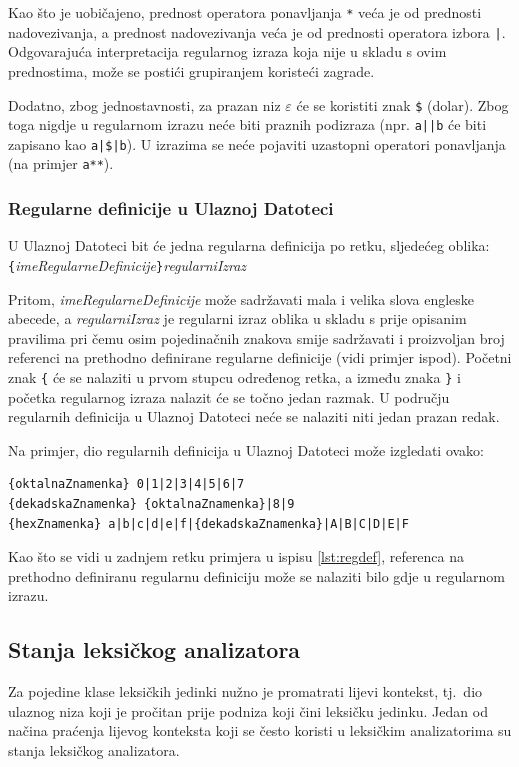 \documentclass[times, 12pt, utf8]{book}
\begin{document}
Kao što je uobičajeno, prednost operatora ponavljanja \verb=*= veća je od prednosti nadovezivanja, a prednost nadovezivanja veća je od prednosti operatora izbora \verb=|=.
Odgovarajuća interpretacija regularnog izraza koja nije u skladu s ovim prednostima, može se postići grupiranjem koristeći zagrade.

Dodatno, zbog jednostavnosti, za prazan niz \(\varepsilon\) će se koristiti znak \verb=$= (dolar).
Zbog toga nigdje u regularnom izrazu neće biti praznih podizraza (npr. \verb=a||b= će biti zapisano kao \verb=a|$|b=).
U izrazima se neće pojaviti uzastopni operatori ponavljanja (na primjer \verb=a**=).

\subsubsection*{Regularne definicije u Ulaznoj Datoteci}
U Ulaznoj Datoteci bit će jedna regularna definicija po retku, sljedećeg oblika:\\
\verb|{|\emph{imeRegularneDefinicije}\verb|}|\textvisiblespace\emph{regularniIzraz}

Pritom, \emph{imeRegularneDefinicije} može sadržavati mala i velika slova engleske abecede, a \emph{regularniIzraz} je regularni izraz oblika u skladu s prije opisanim pravilima pri čemu osim pojedinačnih znakova smije sadržavati i proizvoljan broj referenci na prethodno definirane regularne definicije (vidi primjer ispod).
Početni znak \verb|{| će se nalaziti u prvom stupcu određenog retka, a između znaka \verb|}| i početka regularnog izraza nalazit će se točno jedan razmak.
U području regularnih definicija u Ulaznoj Datoteci neće se nalaziti niti jedan prazan redak.

Na primjer, dio regularnih definicija u Ulaznoj Datoteci može izgledati ovako:

\begin{lstlisting}[caption={Primjer regularnih definicija u Ulaznoj Datoteci.},label=lst:regdef]
{oktalnaZnamenka} 0|1|2|3|4|5|6|7
{dekadskaZnamenka} {oktalnaZnamenka}|8|9
{hexZnamenka} a|b|c|d|e|f|{dekadskaZnamenka}|A|B|C|D|E|F
\end{lstlisting}

Kao što se vidi u zadnjem retku primjera u ispisu \ref{lst:regdef}, referenca na prethodno definiranu regularnu definiciju može se nalaziti bilo gdje u regularnom izrazu.

\subsection{Stanja leksičkog analizatora}
Za pojedine klase leksičkih jedinki nužno je promatrati lijevi kontekst, tj.~dio ulaznog niza koji je pročitan prije podniza koji čini leksičku jedinku.
Jedan od načina praćenja lijevog konteksta koji se često koristi u leksičkim analizatorima su stanja leksičkog analizatora.
\end{document}
